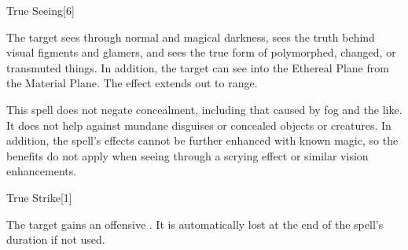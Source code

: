 \begin{spellsection}{True Seeing}[6]
    \begin{spellheader}
    \end{spellheader}
    \begin{spellcontent}
        \begin{spelltargetinginfo}
        \end{spelltargetinginfo}
        \begin{spelleffects}
            \spelleffect The target sees through normal and magical darkness, sees the truth behind visual figments and glamers, and sees the true form of polymorphed, changed, or transmuted things. In addition, the target can see into the Ethereal Plane from the Material Plane. The effect extends out to \rngmed range.
            \spelldur \durshort
        \end{spelleffects}
    \end{spellcontent}
    \begin{spellfooter}
        \spellnotes This spell does not negate concealment, including that caused by fog and the like. It does not help against mundane disguises or concealed objects or creatures. In addition, the spell's effects cannot be further enhanced with known magic, so the benefits do not apply when seeing through a scrying effect or similar vision enhancements.
        \miscastexplode
    \end{spellfooter}
\end{spellsection}

\begin{spellsection}{True Strike}[1]
    \begin{spellheader}
    \end{spellheader}
    \begin{spellcontent}
        \begin{spelltargetinginfo}
        \end{spelltargetinginfo}
        \begin{spelleffects}
            \spelleffect The target gains an offensive . It is automatically lost at the end of the spell's duration if not used.
            \spelldur \durshort
        \end{spelleffects}
    \end{spellcontent}
    \begin{spellfooter}
        \miscastrandom
    \end{spellfooter}
    \begin{spellaugments}
    \end{spellaugments}
\end{spellsection}

